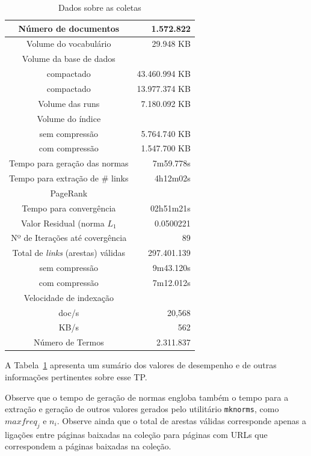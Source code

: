 \documentclass[10pt,twocolumn]{article}
\begin{document}
\begin{table}[htbp]
\centering
\begin{tabular}{|c|r|} \hline
Número de documentos			& 1.572.822		\\\hline
Volume do vocabulário			&	      29.948 KB \\\hline
Volume da base de dados 		&   			\\
          compactado 			&            43.460.994 KB \\
          compactado 			&   	  13.977.374 KB \\\hline
Volume das runs 			&	   7.180.092 KB \\\hline
Volume do índice  			&			\\
  sem compressão  			&	   5.764.740 KB \\
  com compressão  			&	   1.547.700 KB \\\hline
Tempo para geração das normas 		&	    7m59.778s	\\ \hline
Tempo para extração de \# links		&		4h12m02s \\ \hline
PageRank				& 		\\
Tempo para convergência& 02h51m21s	\\
Valor Residual (norma \(L_1\)		& 	0.0500221 \\
Nº de Iterações até covergência		& 	89	\\ \hline
Total de \emph{links} (arestas) válidas & 297.401.139	\\ \hline
  sem compressão 			&	   9m43.120s \\
  com compressão  			&	   7m12.012s \\\hline
Velocidade de indexação			&		\\
  doc/s		  			& 20,568		\\
  KB/s					& 562			\\\hline
Número de Termos			&     2.311.837	\\\hline
\hline
\end{tabular}
\caption{Dados sobre as coletas}
\label{tab:sumario}
\end{table}


A Tabela~\ref{tab:sumario} apresenta um sumário dos valores de
desempenho e de outras informações pertinentes sobre esse TP.

Observe que o tempo de geração de normas engloba também o 
tempo para a extração e geração de outros valores gerados pelo
utilitário \texttt{mknorms}, como \(maxfreq_j\) e \(n_i\). Observe ainda
que o total de arestas válidas corresponde apenas a ligações entre
páginas baixadas na coleção para páginas com URLs que correspondem a
páginas baixadas na coleção.
\end{document}
